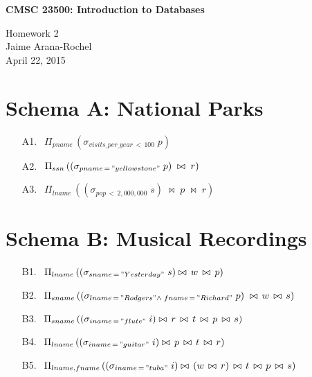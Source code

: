\documentclass{article}[12pt]
\newcommand{\assignment}{Homework 2}
\newcommand{\whoami}{Jaime Arana-Rochel}
\newcommand{\assignmentdate}{April 22, 2015}
\begin{document}
{\large \bf CMSC 23500: Introduction to Databases}

\assignment \\
\whoami \\
\assignmentdate

\hrulefill

\section*{Schema A: National Parks}
\begin{itemize}

\item[A1.] $\:\:\Pi_{pname}\,(\sigma_{visits\_per\_year\,<\,100}\;p)$
\\
\item[A2.] $\:\:\Pi_{ssn}\,((\sigma_{pname\,=\,"yellowstone"}\;p)\; \bowtie\; r)$
\\
\item[A3.] $\:\:\Pi_{lname}\,((\sigma_{pop\,< \,2,000,000}\;s)\;\bowtie\;p\;\bowtie\;r)$
\\
\end{itemize}

\section*{Schema B: Musical Recordings}
\begin{itemize}

\item[B1.] $\:\:\Pi_{lname}\,((\sigma_{sname\,=\,"Yesterday"}\;s) \bowtie\,w\,\bowtie\,p)$
\\
\item[B2.] $\:\:\Pi_{sname}\,((\sigma_{lname\,=\,"Rodgers"\wedge\; fname\,=\,"Richard"}\;p)\;\bowtie\,w\,\bowtie\,s)$
\\
\item[B3.] $\:\:\Pi_{sname}\,((\sigma_{iname\,=\,"flute"}\;i) \bowtie\,r\,\bowtie\,t\,\bowtie\,p\,\bowtie\,s)$
\\
\item[B4.] $\:\:\Pi_{lname}\,((\sigma_{iname\,=\,"guitar"}\;i) \bowtie\,p\,\bowtie\,t\,\bowtie\,r)$
\\
\item[B5.] $\:\:\Pi_{lname,fname}\,((\sigma_{iname\,=\,"tuba"}\;i) \bowtie\,(w\,\bowtie\,r)\,\bowtie\,t\,\bowtie\,p\,\bowtie\,s)$
\end{itemize}
\end{document}
